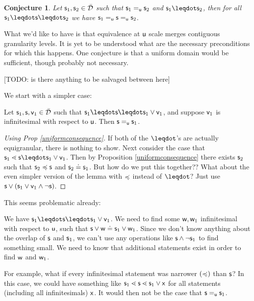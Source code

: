 \documentclass[10pt, onecolumn, nofootinbib]{revtex4-2}
\newtheorem{conj}[equation]{Conjecture}
\begin{document}
\begin{conj}
	Let $\stmt_1, \stmt_2 \in \tdomain$ such that $\stmt_1 \equ \stmt_2$ and $\stmt_1 \finer \stmt_2$, then for all $\stmt_1 \finer \stmt \finer \stmt_2$ we have $\stmt_1 \equ \stmt \equ \stmt_2$.
\end{conj}

\begin{remark}
	What we'd like to have is that equivalence at $\stmt[u]$ scale merges contiguous granularity levels. It is yet to be understood what are the necessary preconditions for which this happens. One conjecture is that a uniform domain would be sufficient, though probably not necessary.
\end{remark}

[TODO: is there anything to be salvaged between here]

We start with a simpler case:

\begin{prop}
	Let $\stmt_1,\stmt,\stmt[v]_1\in\tdomain$ such that $\stmt_1\finer\stmt\finer\stmt_1\OR\stmt[v]_1$, and suppose $\stmt[v]_1$ is infinitesimal with respect to $\stmt[u]$. Then $\stmt\equ\stmt_1$. 
\end{prop}
\begin{proof}[Using Prop \ref{uniformconsequence}]
	If both of the $\finer$'s are actually equigranular, there is nothing to show. Next consider the case that $\stmt_1\sfiner\stmt\finer\stmt_1\OR\stmt[v]_1$. Then by Proposition \ref{uniformconsequence} there exists $\stmt_2$ such that $\stmt_2\narrower\stmt$ and $\stmt_2\eqgran\stmt_1$. But how do we put this together?? What about the even simpler version of the lemma with $\narrower$ instead of $\finer$? Just use $\stmt\OR (\stmt_1\OR\stmt[v]_1 \AND \NOT\stmt)$.
\end{proof}

This seems problematic already:

We have $\stmt_1\finer\stmt\finer\stmt_1\OR\stmt[v]_1$. We need to find some $\stmt[w],\stmt[w]_1$ infinitesimal with respect to $\stmt[u]$, such that $\stmt\OR\stmt[w]\eqgran\stmt_1\OR\stmt[w]_1$. Since we don't know anything about the overlap of $\stmt$ and $\stmt_1$, we can't use any operations like $\stmt\AND\NOT\stmt_1$ to find something small. We need to know that additional statements exist in order to find $\stmt[w]$ and $\stmt[w]_1$. 

For example, what if every infinitesimal statement was narrower $(\narrower)$ than $\stmt$? In this case, we could have something like $\stmt_1\sfiner\stmt\sfiner\stmt_1\OR\stmt[x]$ for all statements (including all infinitesimals) $\stmt[x]$. It would then not be the case that $\stmt\equ\stmt_1$. 
\end{document}
